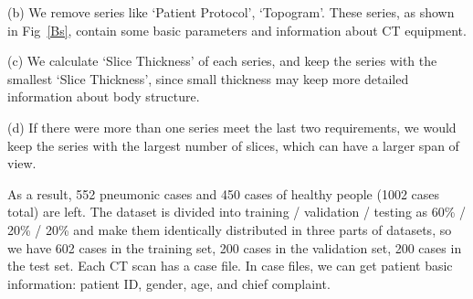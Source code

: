 \documentclass[journal]{IEEEtran}
\begin{document}
(b) We remove series like `Patient Protocol', `Topogram'. These series, as shown in Fig~\ref{Bs}, contain some basic parameters and information about CT equipment.

(c) We calculate `Slice Thickness' of each series, and keep the series with the smallest `Slice Thickness', since small thickness may keep more detailed information about body structure. 

(d) If there were more than one series meet the last two requirements, we would keep the series with the largest number of slices, which can have a larger span of view.

As a result, 552 pneumonic cases and 450 cases of healthy people (1002 cases total) are left.
The dataset is divided into training / validation / testing as 60\% / 20\% / 20\% and make them identically distributed in three parts of datasets, so we have 602 cases in the training set, 200 cases in the validation set, 200 cases in the test set.
Each CT scan has a case file. In case files, we can get patient basic information: patient ID, gender, age, and chief complaint. 
\end{document}
